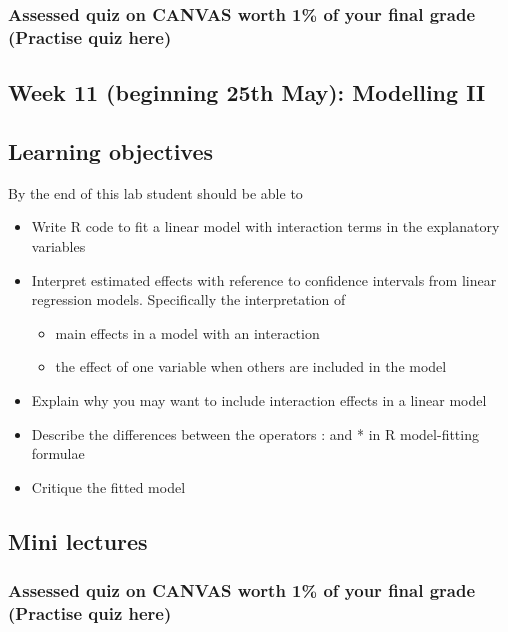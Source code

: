 \documentclass{article}
\begin{document}
\subsubsection*{Assessed quiz on CANVAS worth 1\% of your final grade (Practise quiz here)}

\newpage

\subsection*{Week 11 (beginning 25th May): Modelling II}
\subsection*{Learning objectives}
By the end of this lab student should be able to
\begin{itemize}
\item Write R code to fit a linear model with interaction terms in the explanatory variables
\item Interpret estimated effects with reference to confidence intervals from linear regression models. Specifically the interpretation of
  \begin{itemize}
  \item main effects in a model with an interaction
  \item the effect of one variable when others are included in the model
  \end{itemize}
\item Explain why you may want to include interaction effects in a linear model
\item Describe the differences between the operators : and * in R model-fitting formulae
\item Critique the fitted model
\end{itemize}

\subsection*{Mini lectures}

\subsubsection*{Assessed quiz on CANVAS worth 1\% of your final grade (Practise quiz here)}
\end{document}
